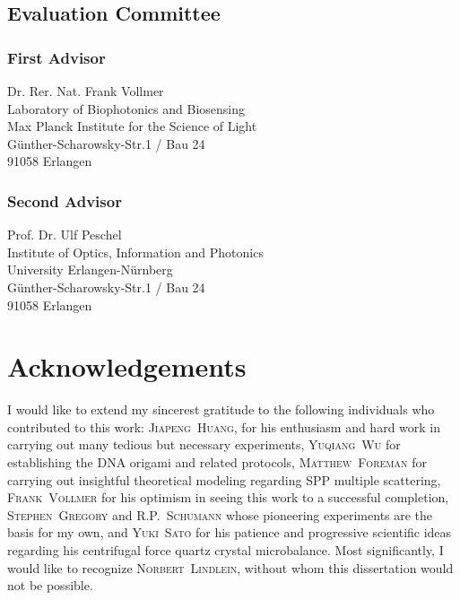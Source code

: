 \documentclass[a4paper,titlepage,onecolumn]{report}
\makeatletter
\newcommand{\name}[1]{\textsc{#1}}
\renewcommand{\todo}[2][]{\tikzexternaldisable\@todo[#1]{#2}\tikzexternalenable}
\makeatother
\begin{document}
\section*{Evaluation Committee}
\subsection*{First Advisor}
Dr. Rer. Nat. Frank Vollmer\\
Laboratory of Biophotonics and Biosensing\\
Max Planck Institute for the Science of Light\\
G\"unther-Scharowsky-Str.1 / Bau 24\\
91058 Erlangen
\subsection*{Second Advisor}
Prof. Dr. Ulf Peschel\\
Institute of Optics, Information and Photonics\\
University Erlangen-N\"urnberg\\
G\"unther-Scharowsky-Str.1 / Bau 24\\
91058 Erlangen

\newpage
\chapter*{Acknowledgements}
I would like to extend my sincerest gratitude to the following individuals
who contributed to this work: \name{Jiapeng~Huang}, for his enthusiasm
and hard work in carrying out many tedious but necessary experiments,
\name{Yuqiang~Wu} for establishing the DNA origami and related protocols,
\name{Matthew~Foreman} for carrying out insightful theoretical modeling
regarding SPP multiple scattering, \name{Frank~Vollmer} for his optimism
in seeing this work to a successful completion, \name{Stephen~Gregory}
and \name{R\@.P.\@~Schumann} whose pioneering experiments are the basis
for my own, and \name{Yuki~Sato} for his patience and progressive
scientific ideas regarding his centrifugal force quartz crystal
microbalance.  Most significantly, I would like to recognize
\name{Norbert~Lindlein}, without whom this dissertation would not be
possible.

\tableofcontents

\begin{abstract}
 \todo{Abstract is written last.}
\end{abstract}
\end{document}
